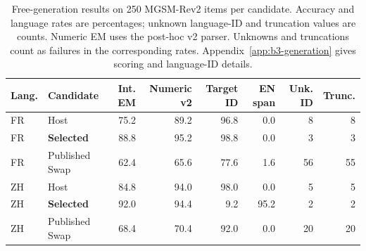 \begin{table}[t]
\centering
\small
\setlength{\tabcolsep}{3pt}
\begin{tabular}{@{}llrrrrrr@{}}
\hline
Lang. & Candidate & Int. EM & Numeric v2 & Target ID & EN span & Unk. ID & Trunc. \\
\hline
FR & Host & 75.2 & 89.2 & 96.8 & 0.0 & 8 & 8 \\
FR & \textbf{Selected} & 88.8 & 95.2 & 98.8 & 0.0 & 3 & 3 \\
FR & Published Swap & 62.4 & 65.6 & 77.6 & 1.6 & 56 & 55 \\
ZH & Host & 84.8 & 94.0 & 98.0 & 0.0 & 5 & 5 \\
ZH & \textbf{Selected} & 92.0 & 94.4 & 9.2 & 95.2 & 2 & 2 \\
ZH & Published Swap & 68.4 & 70.4 & 92.0 & 0.0 & 20 & 20 \\
\hline
\end{tabular}
\caption{Free-generation results on 250 MGSM-Rev2 items per candidate.
Accuracy and language rates are percentages; unknown language-ID and
truncation values are counts. Numeric EM uses the post-hoc v2 parser.
Unknowns and truncations count as failures in the corresponding rates.
Appendix~\ref{app:b3-generation} gives scoring and language-ID details.}
\label{tab:b3-generation}
\end{table}

